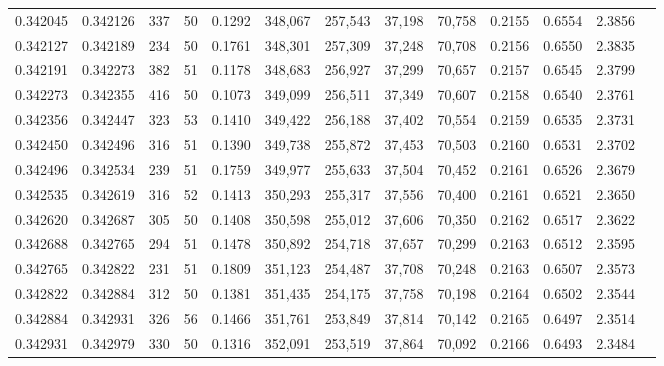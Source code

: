 \begin{tabular}{rrrrrrrrrrrrr}
0.342045 & 0.342126 &   337 &  50 &                                     0.1292 & 348,067 & 257,543 &  37,198 &  70,758 & 0.2155 & 0.6554 & 2.3856 \\
0.342127 & 0.342189 &   234 &  50 &                                     0.1761 & 348,301 & 257,309 &  37,248 &  70,708 & 0.2156 & 0.6550 & 2.3835 \\
0.342191 & 0.342273 &   382 &  51 &                                     0.1178 & 348,683 & 256,927 &  37,299 &  70,657 & 0.2157 & 0.6545 & 2.3799 \\
0.342273 & 0.342355 &   416 &  50 &                                     0.1073 & 349,099 & 256,511 &  37,349 &  70,607 & 0.2158 & 0.6540 & 2.3761 \\
0.342356 & 0.342447 &   323 &  53 &                                     0.1410 & 349,422 & 256,188 &  37,402 &  70,554 & 0.2159 & 0.6535 & 2.3731 \\
0.342450 & 0.342496 &   316 &  51 &                                     0.1390 & 349,738 & 255,872 &  37,453 &  70,503 & 0.2160 & 0.6531 & 2.3702 \\
0.342496 & 0.342534 &   239 &  51 &                                     0.1759 & 349,977 & 255,633 &  37,504 &  70,452 & 0.2161 & 0.6526 & 2.3679 \\
0.342535 & 0.342619 &   316 &  52 &                                     0.1413 & 350,293 & 255,317 &  37,556 &  70,400 & 0.2161 & 0.6521 & 2.3650 \\
0.342620 & 0.342687 &   305 &  50 &                                     0.1408 & 350,598 & 255,012 &  37,606 &  70,350 & 0.2162 & 0.6517 & 2.3622 \\
0.342688 & 0.342765 &   294 &  51 &                                     0.1478 & 350,892 & 254,718 &  37,657 &  70,299 & 0.2163 & 0.6512 & 2.3595 \\
0.342765 & 0.342822 &   231 &  51 &                                     0.1809 & 351,123 & 254,487 &  37,708 &  70,248 & 0.2163 & 0.6507 & 2.3573 \\
0.342822 & 0.342884 &   312 &  50 &                                     0.1381 & 351,435 & 254,175 &  37,758 &  70,198 & 0.2164 & 0.6502 & 2.3544 \\
0.342884 & 0.342931 &   326 &  56 &                                     0.1466 & 351,761 & 253,849 &  37,814 &  70,142 & 0.2165 & 0.6497 & 2.3514 \\
0.342931 & 0.342979 &   330 &  50 &                                     0.1316 & 352,091 & 253,519 &  37,864 &  70,092 & 0.2166 & 0.6493 & 2.3484 \\

\end{tabular}
